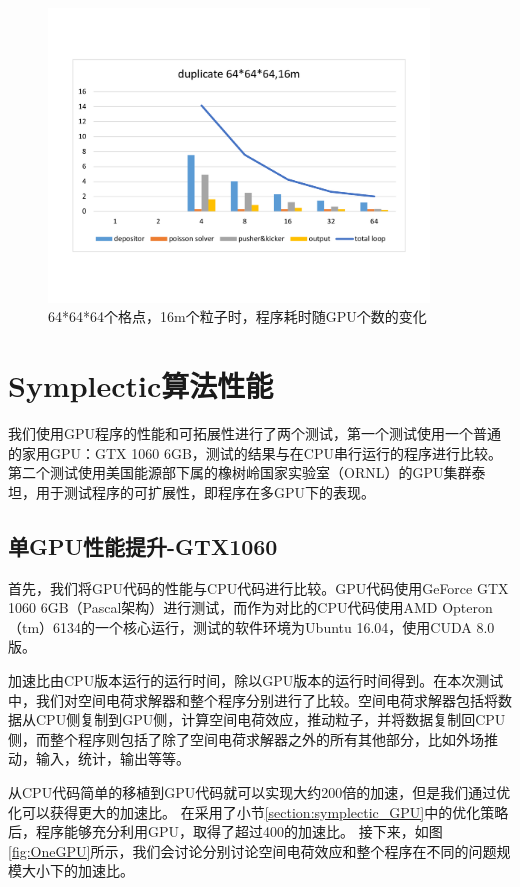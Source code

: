 \begin{figure}[!htb]
  \centering
  \includegraphics[width=0.9\textwidth]{Img/PIC_speedup_Titan_16m.pdf}
  \caption{64*64*64个格点，16m个粒子时，程序耗时随GPU个数的变化}
  \label{fig:PIC_speedup_Titan_16m}
\end{figure}

\section{Symplectic算法性能}               \label{section:performance}
我们使用GPU程序的性能和可拓展性进行了两个测试，第一个测试使用一个普通的家用GPU：GTX 1060 6GB，测试的结果与在CPU串行运行的程序进行比较。第二个测试使用美国能源部下属的橡树岭国家实验室（ORNL）的GPU集群泰坦，用于测试程序的可扩展性，即程序在多GPU下的表现。

\subsection{单GPU性能提升-GTX1060}
首先，我们将GPU代码的性能与CPU代码进行比较。GPU代码使用GeForce GTX 1060 6GB（Pascal架构）进行测试，而作为对比的CPU代码使用AMD Opteron（tm）6134的一个核心运行，测试的软件环境为Ubuntu 16.04，使用CUDA 8.0版。

加速比由CPU版本运行的运行时间，除以GPU版本的运行时间得到。在本次测试中，我们对空间电荷求解器和整个程序分别进行了比较。空间电荷求解器包括将数据从CPU侧复制到GPU侧，计算空间电荷效应，推动粒子，并将数据复制回CPU侧，而整个程序则包括了除了空间电荷求解器之外的所有其他部分，比如外场推动，输入，统计，输出等等。

从CPU代码简单的移植到GPU代码就可以实现大约200倍的加速，但是我们通过优化可以获得更大的加速比。
在采用了小节\ref{section:symplectic_GPU}中的优化策略后，程序能够充分利用GPU，取得了超过400的加速比。
接下来，如图\ref{fig:OneGPU}所示，我们会讨论分别讨论空间电荷效应和整个程序在不同的问题规模大小下的加速比。

